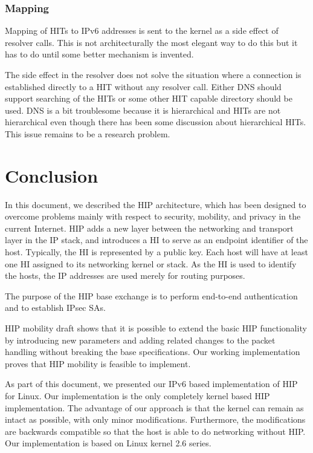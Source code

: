 \subsubsection{Mapping}
\label{sec:mapping_future_work}

Mapping of \acp{HIT} to IPv6 addresses is sent to the kernel as a side
effect of resolver calls. This is not architecturally the most elegant
way to do this but it has to do until some better mechanism is
invented.

The side effect in the resolver does not solve the situation where a
connection is established directly to a \ac{HIT} without any resolver
call. Either \ac{DNS} should support searching of the \acp{HIT} or
some other \ac{HIT} capable directory should be used. \ac{DNS} is a
bit troublesome because it is hierarchical and \acp{HIT} are not
hierarchical even though there has been some discussion about
hierarchical \acp{HIT}. This issue remains to be a research problem.

\section{Conclusion}
\label{sec:conclusion}

In this document, we described the \ac{HIP} architecture, which has
been designed to overcome problems mainly with respect to security,
mobility, and privacy in the current Internet. \ac{HIP} adds a new
layer between the networking and transport layer in the IP stack, and
introduces a \ac{HI} to serve as an endpoint identifier of the
host. Typically, the \ac{HI} is represented by a public key. Each host
will have at least one \ac{HI} assigned to its networking kernel or
stack. As the \ac{HI} is used to identify the hosts, the IP addresses
are used merely for routing purposes.

The purpose of the \ac{HIP} base exchange is to perform end-to-end
authentication and to establish \ac{IPsec} \acp{SA}.

HIP mobility draft shows that it is possible to extend the basic HIP
functionality by introducing new parameters and adding related changes
to the packet handling without breaking the base specifications. Our
working implementation proves that HIP mobility is feasible to implement.

As part of this document, we presented our IPv6 based implementation
of \ac{HIP} for Linux. Our implementation is the only completely
kernel based \ac{HIP} implementation.  The advantage of our approach
is that the kernel can remain as intact as possible, with only minor
modifications. Furthermore, the modifications are backwards compatible
so that the host is able to do networking without \ac{HIP}. Our
implementation is based on Linux kernel 2.6 series.
